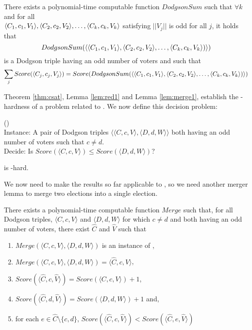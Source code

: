 \begin{lemma} \label{lem:merge1}
    There exists a polynomial-time computable function
    $DodgsonSum$ such that $\forall k$ and for all\\
    $\langle C_{1},c_{1},V_{1} \rangle,\langle C_{2},c_{2},V_{2} \rangle, \dots, \langle C_{k},c_{k},V_{k} \rangle$ satisfying
    $||V_j||$ is odd for all $ j$, it holds that
    \[DodgsonSum(\langle \langle C_{1},c_{1},V_{1} \rangle,\langle C_{2},c_{2},V_{2} \rangle, \dots,
    \langle C_{k},c_{k},V_{k} \rangle) \rangle)\]
    is a Dodgson triple having an odd number of voters and such that
    \[\sum_j Score(\langle C_{j},c_{j},V_{j} \rangle) =
    Score(DodgsonSum(\langle \langle C_{1},c_{1},V_{1} \rangle,\langle C_{2},c_{2},V_{2} \rangle, \dots,
    \langle C_{k},c_{k},V_{k} \rangle) \rangle)\]
\end{lemma}

Theorem \ref{thm:csat}, Lemma \ref{lem:red1} and Lemma
\ref{lem:merge1}, establish the \tp-hardness of a problem related to
. We now define this decision problem:

\begin{problem}{ ()} \\
    \tab Instance: A pair of Dodgson triples
$\langle \langle C,c,V \rangle, \langle D,d,W \rangle \rangle$
both having an odd number of voters such that $c\neq d$.\\
    \tab Decide: Is 
$Score(\langle C,c,V \rangle)\leq Score(\langle D,d,W \rangle)$?
\end{problem}

\begin{lemma} \label{lem:2er}
     is \tp-hard.
\end{lemma}

We now need to make the results so far applicable to 
, so we need another merger lemma to
merge two elections into a single election.

\begin{lemma} \label{lem:merge2}
There exists a polynomial-time computable function $Merge$
    such that, for all Dodgson triples,
    $\langle C,c,V \rangle$ and $\langle D,d,W \rangle$ 
    for which $c\neq d$ and both having an odd number of voters,
    there exist $\hat{C}$ and $\hat{V}$ such that
    \begin{enumerate}
        \item $Merge(\langle C,c,V \rangle, \langle D,d,W \rangle)$
        is an instance of , 
        \item $Merge(\langle C,c,V \rangle, \langle D,d,W \rangle)
        = \langle \hat{C},c,\hat{V} \rangle$,
        \item $Score(\langle \hat{C},c,\hat{V} \rangle) =
        Score(\langle C,c,V \rangle) + 1$,
        \item $Score(\langle \hat{C},d,\hat{V} \rangle) =
        Score(\langle D,d,W \rangle) + 1$ and,
        \item for each $e \in \hat{C}\setminus \{c,d\}$, 
        $Score(\langle \hat{C},c,\hat{V} \rangle) < 
        Score(\langle \hat{C},e,\hat{V} \rangle)$
    \end{enumerate}
\end{lemma}



